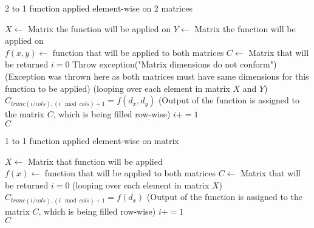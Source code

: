 \begin{algorithm}[H]
\caption{2 to 1 function applied element-wise on 2 matrices}\label{2 to 1 function}
\begin{algorithmic}[1]
\State $X \gets$ Matrix the function will be applied on
\State $Y \gets$ Matrix the function will be applied on
\\
\State $f(x,y) \gets$ function that will be applied to both matrices
\State $C \gets$ Matrix that will be returned
\State $i=0$
\State Throw exception("Matrix dimensions do not conform") (Exception was thrown here as both matrices must have same dimensions for this function to be applied)
\EndIf
{} (looping over each element in matrix $X$ and $Y$)
\State $C_{ trunc(i/cols),{(i\mod cols)}+1} = f(d_{x}, d_{y})$ (Output of the function is assigned to the matrix $C$, which is being filled row-wise)
\State $i+=1$
\EndFor
\\
\Return $C$
\end{algorithmic}
\end{algorithm}

\begin{algorithm}[H]
\caption{1 to 1 function applied element-wise on matrix}\label{1 to 1 function}
\begin{algorithmic}[1]
\State $X \gets$ Matrix that function will be applied
\\
\State $f(x) \gets$ function that will be applied to both matrices
\State $C \gets$ Matrix that will be returned
\State $i=0$
 (looping over each element in matrix $X$)
\State $C_{ trunc(i/cols),{(i\mod cols)}+1} = f(d_{x})$ (Output of the function is assigned to the matrix $C$, which is being filled row-wise)
\State $i+=1$
\EndFor
\\
\Return $C$
\end{algorithmic}
\end{algorithm}


